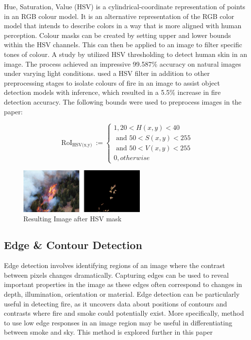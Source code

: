 \documentclass[lettersize,journal]{IEEEtran}
\begin{document}
Hue, Saturation, Value (HSV) is a cylindrical-coordinate representation
of points in an RGB colour model. It is an alternative representation of
the RGB color model that intends to describe colors in a way that is
more aligned with human perception. Colour masks can be created by
setting upper and lower bounds within the HSV channels. This can then be
applied to an image to filter specific tones of colour. A study by
\cite{skinhsv} utilized HSV thresholding to detect human skin in an
image. The process achieved an impressive 99.587\% accuracy on natural
images under varying light conditions. \cite{prepfire} used a HSV filter
in addition to other preprocessing stages to isolate colours of fire in
an image to assist object detection models with inference, which
resulted in a 5.5\% increase in fire detection accuracy. The following
bounds were used to preprocess images in the paper:

\[\text{ RoI}_{\text{HSV(x,y) }} := \begin{cases}
        1, 20 < H(x,y) < 40 \\
        \text{ and }50 < S(x,y) < 255 \\
        \text{ and }50 < V(x,y) < 255 \\
        0, otherwise
\end{cases}\]

\begin{figure}
        \centering
        \includegraphics[width=2.5in]{hsv_filter.jpg}
        \caption{Resulting Image after HSV mask}
\end{figure}

\subsection{Edge \& Contour Detection}

Edge detection involves identifying regions of an image where the
contrast between pixels changes dramatically. Capturing edges can be
used to reveal important properties in the image as these edges often
correspond to changes in depth, illumination, orientation or material.
Edge detection can be particularly useful in detecting fire, as it
uncovers data about positions of contours and contrasts where fire and
smoke could potentially exist. More specifically, method to use low edge
responses in an image region may be useful in differentiating between
smoke and sky. This method is explored further in this paper
\end{document}
